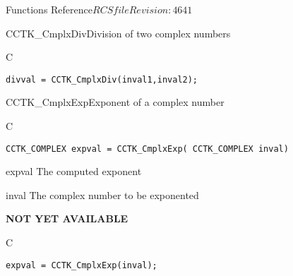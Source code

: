 \begin{cactuspart}{ Functions Reference}{$RCSfile$}{$Revision: 4641 $}
\begin{FunctionDescription}{CCTK\_CmplxDiv}{Division of two complex numbers}
\begin{ExampleSection}
\begin{Example}{C}
\begin{verbatim}
divval = CCTK_CmplxDiv(inval1,inval2);
\end{verbatim}
\end{Example}
\end{ExampleSection}
\end{FunctionDescription}


\begin{FunctionDescription}{CCTK\_CmplxExp}{Exponent of a complex number}
\label{CCTK-CmplxExp}
\begin{SynopsisSection}
\begin{Synopsis}{C}
\begin{verbatim}CCTK_COMPLEX expval = CCTK_CmplxExp( CCTK_COMPLEX inval)\end{verbatim}
\end{Synopsis}
\end{SynopsisSection}
\begin{ParameterSection}
\begin{Parameter}{expval}
The computed exponent
\end{Parameter}
\begin{Parameter}{inval}
The complex number to be exponented
\end{Parameter}
\end{ParameterSection}
\begin{Discussion}
{\bf NOT YET AVAILABLE}
\end{Discussion}
\begin{ExampleSection}
\begin{Example}{C}
\begin{verbatim}
expval = CCTK_CmplxExp(inval);
\end{verbatim}
\end{Example}
\end{ExampleSection}
\end{FunctionDescription}


\end{cactuspart}
